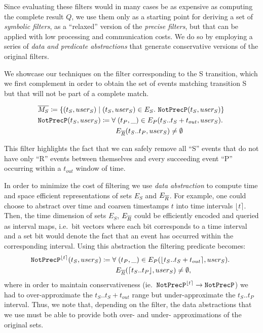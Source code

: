 Since evaluating these filters would in many cases be as expensive as computing
the complete result $Q$, we use them only as a starting point for deriving a set
of {\em symbolic filters}, as a ``relaxed'' version of the {\em precise
	filters}, but that can be applied with low processing and communication 
	costs.
We do so by employing a series of {\em data and predicate abstractions} 
that generate conservative versions of the original filters.


We showcase our techniques on the filter corresponding to the S transition,
which we first complement in order to obtain the set of events matching
transition S but that will not be part of a complete match.

\newcommand{\oMS}{\overline{M_S}}
\newcommand{\NotExistsP}{\ident{NotExistsP}}
\newcommand{\NotPrecedesP}{\ident{NotPrecP}}

\newcommand{\interval}[1]{\lfloor #1 \rceil}
\newcommand{\uinterval}[1]{\lceil #1 \rfloor}
\newcommand{\hashid}[1]{\langle #1 \rangle}


\begin{align*}
&
\oMS \coloneq 
\{ (t_S, user_S) \mid (t_S, user_S) \in E_S .\ 
\NotPrecedesP(t_S, user_S) 
\}
\\
&
\NotPrecedesP(t_S, user_S) \coloneq 
\forall\; (t_P, \_) \in E_P(t_S..t_S + t_{out}, user_S) .\ 
\\
&\qqqquad\qquad\quad
E_{\oR}(t_S..t_P, user_S) \neq \emptyset 
\end{align*}

This filter highlights the fact that we can safely remove all ``S'' events that
do not have only ``R'' events between themselves and every succeeding event
``P'' occurring within a $t_{out}$ window of time.

In order to minimize the cost of filtering we use {\em data
	abstraction} to compute time and space efficient representations of sets 
	$E_S$
and $E_{\overline{R}}$.
For example, one could choose to abstract over time and coarsen timestamps $t$
into time intervals $\interval{t}$. 
Then, the time dimension of sets $E_S$, $E_{\overline{R}}$ could be efficiently encoded
and queried as interval maps, i.e.\ bit vectors where each bit corresponds to a
time interval and a set bit would denote the fact that an event has occurred
within the corresponding interval.
Using this abstraction the filtering predicate becomes:
\begin{align*}
&
\NotPrecedesP^{\interval{t}}(t_S, user_S) \coloneq 
\forall\; (t_P, \_) \in E_P(\interval{t_S..t_S + t_{out}}, user_S) .\ 
\\
&
\qqqquad\qqquad
E_{\oR}(\uinterval{t_S..t_P}, user_S) \neq \emptyset ,
\end{align*}
where in order to maintain conservativeness (ie.\
$\NotPrecedesP^{\interval{t}} \rightarrow \NotPrecedesP$) we had to
over-approximate the $t_S..t_S + t_{out}$ range but under-approximate the
$t_S..t_P$ interval.
Thus, we note that, depending on the filter, the data abstractions that we
use must be able to provide both over- and under- approximations of the original
sets.

